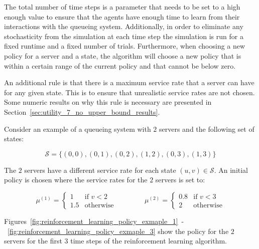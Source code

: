 The total number of time steps is a parameter that needs to be set to a high
enough value to ensure that the agents have enough time to learn from their
interactions with the queueing system.
Additionally, in order to eliminate any stochasticity from the simulation
at each time step the simulation is run for a fixed runtime and a fixed number
of trials.
Furthermore, when choosing a new policy for a server and a state, the
algorithm will choose a new policy that is within a certain range of the
current policy and that cannot be below zero.

An additional rule is that there is a maximum service rate that a server can
have for any given state.
This is to ensure that unrealistic service rates are not chosen.
Some numeric results on why this rule is necessary are presented in
Section~\ref{sec:utility_7_no_upper_bound_results}.

Consider an example of a queueing system with \(2\) servers and the following
set of states:

\begin{equation}
    \mathcal{S} = \{(0, 0), (0, 1), (0, 2), (1, 2), (0, 3), (1, 3)\}
\end{equation}

The \(2\) servers have a different service rate for each state
\((u, v) \in \mathcal{S}\).
An initial policy is chosen where the service rates for the \(2\) servers is
set to:

\begin{equation*}
    \mu^{(1)} =
    \begin{cases}
        1 & \text{if } v < 2 \\
        1.5 & \text{otherwise}
    \end{cases}
    \qquad \qquad
    \mu^{(2)} =
    \begin{cases}
        0.8 & \text{if } v < 3 \\
        2 & \text{otherwise}
    \end{cases}
\end{equation*}

Figures~\ref{fig:reinforcement_learning_policy_exmaple_1}~-~\ref{fig:reinforcement_learning_policy_exmaple_3} show the
policy for the \(2\) servers for the first \(3\) time steps of the
reinforcement learning algorithm.


